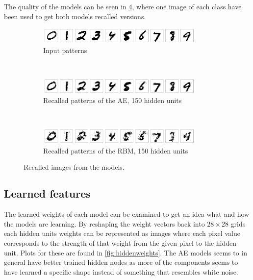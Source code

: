 \documentclass{article}
\begin{document}
The quality of the models can be seen in \cref{fig:recall},
where one image of each class have been used to get both models recalled versions.
\begin{figure}[!ht]
  \centering
  \begin{subfigure}[t]{\textwidth}
    \centering
    \includegraphics[width=0.9\textwidth]{../plots/3_1_1/orig_images.png}
    \caption{Input patterns}
    \label{fig:inputpatterns}
  \end{subfigure}
  ~
  \begin{subfigure}[t]{\textwidth}
    \centering
    \includegraphics[width=0.9\textwidth]{../plots/3_1_1/recall_ae_h150.png}
    \caption{Recalled patterns of the AE, 150 hidden units}
    \label{fig:recallae}
  \end{subfigure}
  ~
  \begin{subfigure}[t]{\textwidth}
    \centering
    \includegraphics[width=0.9\textwidth]{../plots/3_1_1/recall_rbm_h150.png}
    \caption{Recalled patterns of the RBM, 150 hidden units}
    \label{fig:recallrbm}
  \end{subfigure}
  \caption{Recalled images from the models.}
  \label{fig:recall}
\end{figure}

\subsection{Learned features}
The learned weights of each model can be examined to get an idea what and how the models are learning.
By reshaping the weight vectors back into $28 \times 28$ grids
each hidden units weights can be represented as images
where each pixel value corresponds to the strength of that weight from the given pixel to the hidden unit.
Plots for these are found in \cref{fig:hiddenweights}.
The AE models seems to in general have better trained hidden nodes
as more of the components seems to have learned a specific shape
instead of something that resembles white noise.
\end{document}
